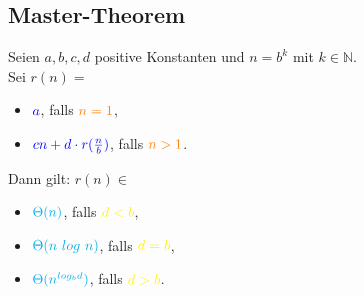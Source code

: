 \documentclass[12pt,a4paper]{article}
\begin{document}
\subsection{Master-Theorem}
Seien $a,b,c,d$ positive Konstanten und $n=b^k$ mit $k\in\mathbb{N}$.\\
Sei $r(n)=$\begin{itemize}
\item $\color{blue}a$, falls $\color{orange}n=1$,
\item $\color{blue}cn+d\cdot r(\frac{n}{b})$, falls $\color{orange}n>1$.
\end{itemize}
Dann gilt: $r(n)\in$\begin{itemize}
\item $\color{cyan}\Theta(n)$, falls $\color{yellow}d<b$,
\item $\color{cyan}\Theta(n~log~n)$, falls $\color{yellow}d=b$,
\item $\color{cyan}\Theta(n^{log_bd})$, falls $\color{yellow}d>b$.
\end{itemize}
\end{document}
